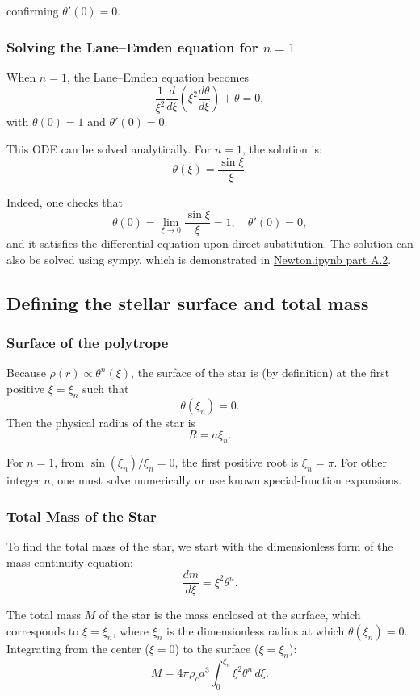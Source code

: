 \documentclass[12pt]{article}
\begin{document}
confirming \(\theta'(0) = 0\).

\subsubsection{Solving the Lane–Emden equation for \(n=1\)}

When \(n = 1\), the Lane–Emden equation becomes
\[
\frac{1}{\xi^2}
\frac{d}{d\xi}
\left(
\xi^2 \frac{d\theta}{d\xi}
\right)
+ \theta = 0,
\]
with \(\theta(0)=1\) and \(\theta'(0)=0\).

This ODE can be solved analytically. For \(n=1\), the solution is:
\[
\theta(\xi) = \frac{\sin \xi}{\xi}.
\]

Indeed, one checks that
\[
\theta(0) = \lim_{\xi \to 0} \frac{\sin \xi}{\xi} = 1,
\quad
\theta'(0) = 0,
\]
and it satisfies the differential equation upon direct substitution. The solution can also be solved using sympy, which is demonstrated in \href{Newton.ipynb}{Newton.ipynb part A.2}.

\subsection{Defining the stellar surface and total mass}

\subsubsection{Surface of the polytrope}

Because \(\rho(r) \propto \theta^n(\xi)\), the surface of the star is (by definition) at the first positive \(\xi = \xi_n\) such that 
\[
\theta(\xi_n) = 0.
\]
Then the physical radius of the star is 
\[
R = a \xi_n.
\]

For \(n=1\), from \(\sin(\xi_n)/\xi_n = 0\), the first positive root is \(\xi_n = \pi\). For other integer \(n\), one must solve numerically or use known special-function expansions.

\subsubsection{Total Mass of the Star}

To find the total mass of the star, we start with the dimensionless form of the mass-continuity equation:
\[
\frac{dm}{d\xi} = \xi^2 \theta^n.
\]

The total mass \(M\) of the star is the mass enclosed at the surface, which corresponds to \(\xi = \xi_n\), where \(\xi_n\) is the dimensionless radius at which \(\theta(\xi_n) = 0\). Integrating from the center (\(\xi = 0\)) to the surface (\(\xi = \xi_n\)):
\[
M = 4\pi \rho_c a^3 \int_0^{\xi_n} \xi^2 \theta^n \, d\xi.
\]
\end{document}
